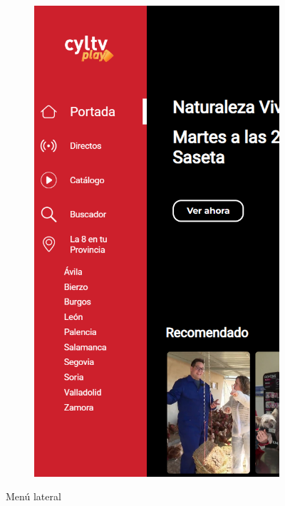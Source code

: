\begin{figure}[H]
\begin{subfigure}[c]{0.1\textwidth}
        \label{fig:Widget_banner}
    \end{subfigure}
    \hspace{0.05\textwidth}
    \begin{subfigure}[c]{0.1\textwidth}
        \includegraphics[width=\textwidth]{imaxes/OTT/menu_lateral_abierto.png}
        \label{fig:Widget_mosaico}
    \end{subfigure}
    \caption{Menú lateral}
\end{figure}

